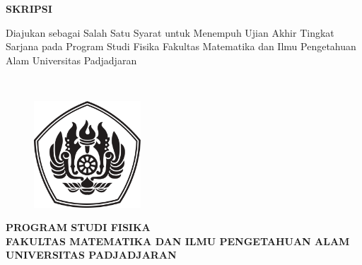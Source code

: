 \newpage
\begin{titlepage}
    \thispagestyle{empty}
    \begin{center}
        \begin{large}
            \begin{spacing}{1}
                \textbf{\MakeUppercase{\draftTitle}}
            \end{spacing}
        \end{large}

        \vspace{2cm}
        \textbf{SKRIPSI}

        \vspace{1cm}
        Diajukan sebagai Salah Satu Syarat untuk Menempuh Ujian Akhir Tingkat Sarjana pada Program Studi Fisika Fakultas Matematika dan Ilmu Pengetahuan Alam Universitas Padjadjaran
        
        \vspace{1cm}
        \textbf{\MakeUppercase{\fullName\\
        \NPM}}

        \vspace{2cm}
        \begin{figure}[h]
            \centering
            \includegraphics[width=4cm]{Images/logo-unpad-bw.pdf}
            \label{fig:unpadlogo}
        \end{figure}

        \vspace{2cm}
        \textbf{PROGRAM STUDI FISIKA\\
        FAKULTAS MATEMATIKA DAN ILMU PENGETAHUAN ALAM\\
        UNIVERSITAS PADJADJARAN\\}

        \vspace{\baselineskip}
        \textbf{\large \the\year{}}
    \end{center}
\end{titlepage}